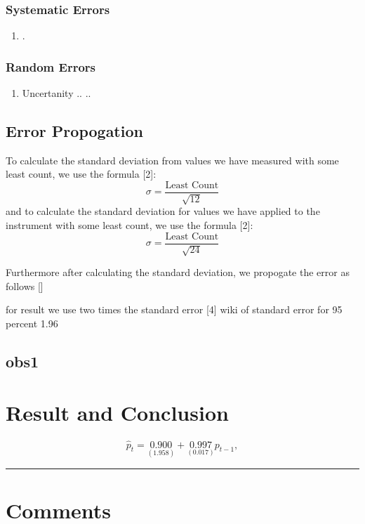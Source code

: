 \documentclass[%
sor,
 jor,
 amsmath,amssymb,
 reprint,
]{revtex4-2}
\begin{document}
\subsubsection{Systematic Errors}
\begin{enumerate}
	\item .
\end{enumerate}

\subsubsection{Random Errors}
\begin{enumerate}
	\item Uncertanity .. .. 
\end{enumerate}
\subsection{Error Propogation}
To calculate the standard deviation from values we have measured with some least count, we use the formula [2]: 
\begin{equation}
\sigma = \frac{\text{Least Count}}{\sqrt{12}}
\end{equation}
and to calculate the standard deviation for values we have applied to the instrument with some least count, we use the formula [2]: 
\begin{equation}
\sigma = \frac{\text{Least Count}}{\sqrt{24}}
\end{equation}

Furthermore after calculating the standard deviation, we propogate the error as follows []

for result we use two times the standard error [4] wiki of standard error
for 95 percent 1.96
\subsection{obs1}


\section{Result and Conclusion}

\begin{equation}
\hat{p}_{t} = \underset{(1.958)}{0.900}+\underset{(0.017)}{0.997}p_{t-1},
\end{equation}
\vspace{1cm}

\vspace{1cm}
\hrule
\vspace{3cm}
\nocite{*}

\appendix
\section{Comments}
\end{document}

